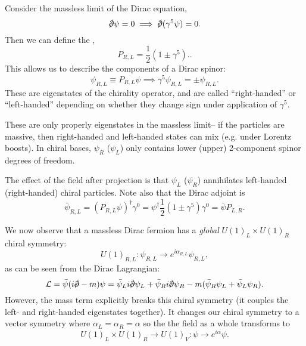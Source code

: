 Consider the massless limit of the Dirac equation,
\begin{equation}
    \slashed{\p}\psi = 0 \implies \slashed{\p}(\gamma^5 \psi)=0.
\end{equation}
Then we can define the ,
\begin{equation}
    P_{R,L}=\frac{1}{2}(1\pm \gamma^5)..
\end{equation}
This allows us to describe the components of a Dirac spinor:
\begin{equation}
    \psi_{R,L}\equiv P_{R,L}\psi \implies \gamma^5 \psi_{R,L}=\pm \psi_{R,L}.
\end{equation}
These are eigenstates of the chirality operator, and are called ``right-handed'' or ``left-handed'' depending on whether they change sign under application of $\gamma^5$.

These are only properly eigenstates in the massless limit-- if the particles are massive, then right-handed and left-handed states can mix (e.g. under Lorentz boosts). In chiral bases, $\psi_{R}$ ($\psi_L$) only contains lower (upper) 2-component spinor degrees of freedom.

The effect of the field after projection is that $\psi_L$ ($\psi_R$) annihilates left-handed (right-handed) chiral particles. Note also that the Dirac adjoint is
\begin{equation}
    \bar \psi_{R,L}=(P_{R,L}\psi)^\dagger \gamma^0 = \psi^\dagger \frac{1}{2} (1\pm \gamma^5)\gamma^0 = \bar \psi P_{L,R}.
\end{equation}

We now observe that a massless Dirac fermion has a \emph{global} $U(1)_L\times U(1)_R$ chiral symmetry:
\begin{equation*}
    U(1)_{R,L}: \psi_{R,L}\to e^{i\alpha_{R,L}} \psi_{R,L},
\end{equation*}
as can be seen from the Dirac Lagrangian:
\begin{equation*}
    \cL= \bar \psi(i\slashed{\p}-m)\psi= \bar \psi_L i \slashed{\p}\psi_L + \bar \psi_R i \slashed{\p}\psi_R-m(\bar \psi_R \psi_L +\bar \psi_L \psi_R).
\end{equation*}
However, the mass term explicitly breaks this chiral symmetry (it couples the left- and right-handed eigenstates together). It changes our chiral symmetry to a vector symmetry where $\alpha_L=\alpha_R = \alpha$ so the the field as a whole transforms to
\begin{equation*}
    U(1)_L \times U(1)_R \to U(1)_V: \psi \to e^{i\alpha}\psi.
\end{equation*}

